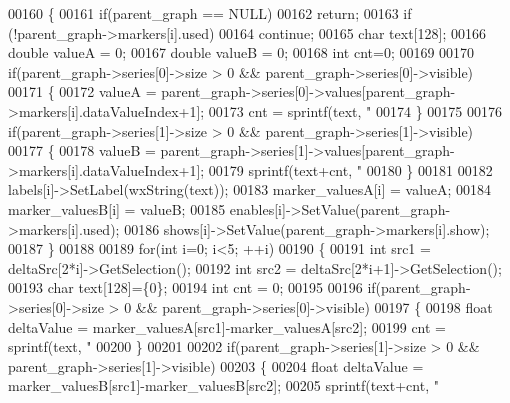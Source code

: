 \begin{DoxyCode}
{{{{00160         \{
00161             \textcolor{keywordflow}{if}(parent_graph == NULL)
00162                 \textcolor{keywordflow}{return};
00163             \textcolor{keywordflow}{if} (!parent_graph->markers[i].used)
00164                 \textcolor{keywordflow}{continue};
00165             \textcolor{keywordtype}{char} text[128];
00166             \textcolor{keywordtype}{double} valueA = 0;
00167             \textcolor{keywordtype}{double} valueB = 0;
00168             \textcolor{keywordtype}{int} cnt=0;
00169 
00170             \textcolor{keywordflow}{if}(parent_graph->series[0]->size > 0 && parent_graph->series[0]->visible)
00171             \{
00172                 valueA = parent_graph->series[0]->values[parent_graph->markers[i].dataValueIndex+1];
00173                 cnt = sprintf(text, \textcolor{stringliteral}{"%
00174             \}
00175 
00176             \textcolor{keywordflow}{if}(parent_graph->series[1]->size > 0 && parent_graph->series[1]->visible)
00177             \{
00178                 valueB = parent_graph->series[1]->values[parent_graph->markers[i].dataValueIndex+1];
00179                 sprintf(text+cnt, \textcolor{stringliteral}{"%
00180             \}
00181 
00182             labels[i]->SetLabel(wxString(text));
00183             marker_valuesA[i] = valueA;
00184             marker_valuesB[i] = valueB;
00185             enables[i]->SetValue(parent_graph->markers[i].used);
00186             shows[i]->SetValue(parent_graph->markers[i].show);
00187         \}
00188 
00189         \textcolor{keywordflow}{for}(\textcolor{keywordtype}{int} i=0; i<5; ++i)
00190         \{
00191             \textcolor{keywordtype}{int} src1 = deltaSrc[2*i]->GetSelection();
00192             \textcolor{keywordtype}{int} src2 = deltaSrc[2*i+1]->GetSelection();
00193             \textcolor{keywordtype}{char} text[128]=\{0\};
00194             \textcolor{keywordtype}{int} cnt = 0;
00195 
00196             \textcolor{keywordflow}{if}(parent_graph->series[0]->size > 0 && parent_graph->series[0]->visible)
00197             \{
00198                 \textcolor{keywordtype}{float} deltaValue = marker_valuesA[src1]-marker_valuesA[src2];
00199                 cnt = sprintf(text, \textcolor{stringliteral}{"%
00200             \}
00201 
00202             \textcolor{keywordflow}{if}(parent_graph->series[1]->size > 0 && parent_graph->series[1]->visible)
00203             \{
00204                 \textcolor{keywordtype}{float} deltaValue = marker_valuesB[src1]-marker_valuesB[src2];
00205                 sprintf(text+cnt, \textcolor{stringliteral}{"%
}}}}}}}}
\end{DoxyCode}
